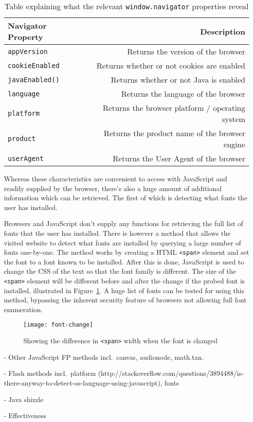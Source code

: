 \begin{table}[h]
\centering
\begin{tabular}{| l | r |}
    \hline
    \textbf{Navigator Property} & \textbf{Description} \\ \hline
    \texttt{appVersion} & {Returns the version of the browser} \\ \hline
    \texttt{cookieEnabled} & {Returns whether or not cookies are enabled} \\ \hline
    \texttt{javaEnabled()} & {Returns whether or not Java is enabled} \\ \hline
    \texttt{language} & {Returns the language of the browser} \\ \hline
    \texttt{platform} & {Returns the browser platform / operating system} \\ \hline
    \texttt{product} & {Returns the product name of the browser engine} \\ \hline
    \texttt{userAgent} & {Returns the User Agent of the browser} \\
    \hline
\end{tabular}
\caption{Table explaining what the relevant \texttt{window.navigator} properties reveal}
\label{tab:navigator-props}
\end{table}

Whereas these characteristics are convenient to access with JavaScript and readily supplied by the browser, there's also a huge amount of additional information which can be retrieved.
The first of which is detecting what fonts the user has installed.

Browsers and JavaScript don't supply any functions for retrieving the full list of fonts that the user has installed.
There is however a method that allows the visited website to detect what fonts are installed by querying a large number of fonts one-by-one.
The method works by creating a HTML \texttt{<span>} element and set the font to a font known to be installed.
After this is done, JavaScript is used to change the CSS of the text so that the font family is different.
The size of the \texttt{<span>} element will be different before and after the change if the probed font is installed, illustrated in Figure~\ref{fig:font-change}.
A huge list of fonts can be tested for using this method, bypassing the inherent security feature of browsers not allowing full font enumeration.

\begin{figure}[h]
\caption{Showing the difference in \texttt{<span>} width when the font is changed}
\texttt{[image: font-change]}
\centering
\label{fig:font-change}
\end{figure}


- Other JavaScript FP methods incl.\ canvas, audionode, math.tan.

- Flash methods incl.\ platform (http://stackoverflow.com/questions/3894488/is-there-anyway-to-detect-os-language-using-javascript), fonts

- Java shizzle

- Effectiveness
